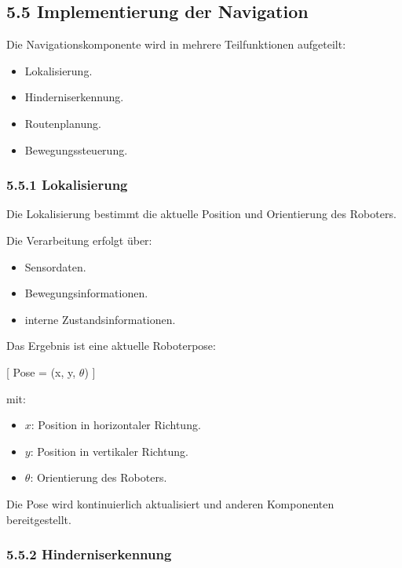 \documentclass[
]{article}
\providecommand{\tightlist}{%
  \setlength{\itemsep}{0pt}\setlength{\parskip}{0pt}}
\begin{document}
\subsection{5.5 Implementierung der
Navigation}\label{implementierung-der-navigation}

Die Navigationskomponente wird in mehrere Teilfunktionen aufgeteilt:

\begin{itemize}
\tightlist
\item
  Lokalisierung.
\item
  Hinderniserkennung.
\item
  Routenplanung.
\item
  Bewegungssteuerung.
\end{itemize}

\subsubsection{5.5.1 Lokalisierung}\label{lokalisierung}

Die Lokalisierung bestimmt die aktuelle Position und Orientierung des
Roboters.

Die Verarbeitung erfolgt über:

\begin{itemize}
\tightlist
\item
  Sensordaten.
\item
  Bewegungsinformationen.
\item
  interne Zustandsinformationen.
\end{itemize}

Das Ergebnis ist eine aktuelle Roboterpose:

{[} Pose = (x, y, \(\theta\)) {]}

mit:

\begin{itemize}
\tightlist
\item
  \(x\): Position in horizontaler Richtung.
\item
  \(y\): Position in vertikaler Richtung.
\item
  \(\theta\): Orientierung des Roboters.
\end{itemize}

Die Pose wird kontinuierlich aktualisiert und anderen Komponenten
bereitgestellt.

\subsubsection{5.5.2 Hinderniserkennung}\label{hinderniserkennung-1}
\end{document}
